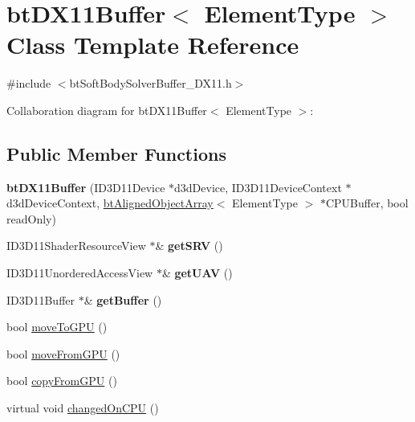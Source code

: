 \hypertarget{classbt_d_x11_buffer}{\section{bt\+D\+X11\+Buffer$<$ Element\+Type $>$ Class Template Reference}
\label{classbt_d_x11_buffer}
}


{\ttfamily \#include $<$bt\+Soft\+Body\+Solver\+Buffer\+\_\+\+D\+X11.\+h$>$}



Collaboration diagram for bt\+D\+X11\+Buffer$<$ Element\+Type $>$\+:
\subsection*{Public Member Functions}
\begin{DoxyCompactItemize}
\item 
\hypertarget{classbt_d_x11_buffer_a3d7fff3e4d181681c5722a54b20720f6}{{\bfseries bt\+D\+X11\+Buffer} (I\+D3\+D11\+Device $\ast$d3d\+Device, I\+D3\+D11\+Device\+Context $\ast$d3d\+Device\+Context, \hyperlink{classbt_aligned_object_array}{bt\+Aligned\+Object\+Array}$<$ Element\+Type $>$ $\ast$C\+P\+U\+Buffer, bool read\+Only)}\label{classbt_d_x11_buffer_a3d7fff3e4d181681c5722a54b20720f6}

\item 
\hypertarget{classbt_d_x11_buffer_a9ee37f8869ae336c9f6aae1aea15acd0}{I\+D3\+D11\+Shader\+Resource\+View $\ast$\& {\bfseries get\+S\+R\+V} ()}\label{classbt_d_x11_buffer_a9ee37f8869ae336c9f6aae1aea15acd0}

\item 
\hypertarget{classbt_d_x11_buffer_a9ffb747f0b720537b57e041f3624fad9}{I\+D3\+D11\+Unordered\+Access\+View $\ast$\& {\bfseries get\+U\+A\+V} ()}\label{classbt_d_x11_buffer_a9ffb747f0b720537b57e041f3624fad9}

\item 
\hypertarget{classbt_d_x11_buffer_a73096596706e2a9c91744c7f6ff44265}{I\+D3\+D11\+Buffer $\ast$\& {\bfseries get\+Buffer} ()}\label{classbt_d_x11_buffer_a73096596706e2a9c91744c7f6ff44265}

\item 
bool \hyperlink{classbt_d_x11_buffer_a6d374469254cb3c03d6e18d03ca8a23c}{move\+To\+G\+P\+U} ()
\item 
bool \hyperlink{classbt_d_x11_buffer_aacac21503809131b8991c0cee42e0b1b}{move\+From\+G\+P\+U} ()
\item 
bool \hyperlink{classbt_d_x11_buffer_a116aed0cd9715e4776e08ecccc68d01b}{copy\+From\+G\+P\+U} ()
\item 
virtual void \hyperlink{classbt_d_x11_buffer_a8018a897370ed73bcca0b4907b9479b1}{changed\+On\+C\+P\+U} ()
\end{DoxyCompactItemize}
